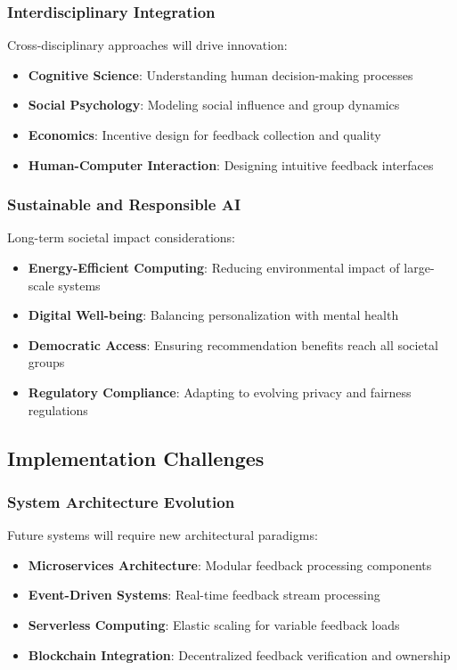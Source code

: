 \subsubsection{Interdisciplinary Integration}

Cross-disciplinary approaches will drive innovation:

\begin{itemize}
    \item \textbf{Cognitive Science}: Understanding human decision-making processes
    \item \textbf{Social Psychology}: Modeling social influence and group dynamics
    \item \textbf{Economics}: Incentive design for feedback collection and quality
    \item \textbf{Human-Computer Interaction}: Designing intuitive feedback interfaces
\end{itemize}

\subsubsection{Sustainable and Responsible AI}

Long-term societal impact considerations:

\begin{itemize}
    \item \textbf{Energy-Efficient Computing}: Reducing environmental impact of large-scale systems
    \item \textbf{Digital Well-being}: Balancing personalization with mental health
    \item \textbf{Democratic Access}: Ensuring recommendation benefits reach all societal groups
    \item \textbf{Regulatory Compliance}: Adapting to evolving privacy and fairness regulations
\end{itemize}

\subsection{Implementation Challenges}

\subsubsection{System Architecture Evolution}

Future systems will require new architectural paradigms:

\begin{itemize}
    \item \textbf{Microservices Architecture}: Modular feedback processing components
    \item \textbf{Event-Driven Systems}: Real-time feedback stream processing
    \item \textbf{Serverless Computing}: Elastic scaling for variable feedback loads
    \item \textbf{Blockchain Integration}: Decentralized feedback verification and ownership
\end{itemize}

